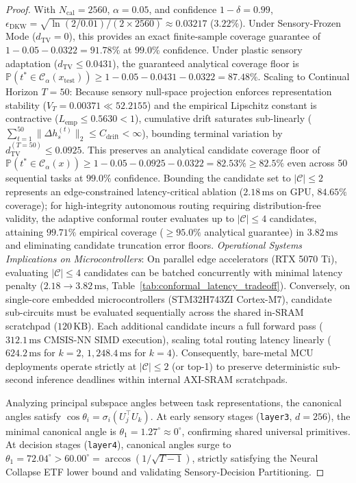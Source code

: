 \documentclass{article}
\begin{document}
\begin{proof}
With $N_{\mathrm{cal}} = 2560$, $\alpha = 0.05$, and confidence $1 - \delta = 0.99$, $\epsilon_{\mathrm{DKW}} = \sqrt{\ln(2/0.01)/(2 \times 2560)} \approx 0.03217$ ($3.22\%$).
Under Sensory-Frozen Mode ($d_{\mathrm{TV}} = 0$), this provides an exact finite-sample coverage guarantee of $1 - 0.05 - 0.0322 = \mathbf{91.78\%}$ at $99.0\%$ confidence. Under plastic sensory adaptation ($d_{\mathrm{TV}} \le 0.0431$), the guaranteed analytical coverage floor is $\mathbb{P}(t^* \in \mathcal{C}_\alpha(x_{\mathrm{test}})) \ge 1 - 0.05 - 0.0431 - 0.0322 = \mathbf{87.48\%}$.
Scaling to Continual Horizon $T=50$: Because sensory null-space projection enforces representation stability ($V_T = 0.00371 \ll 52.2155$) and the empirical Lipschitz constant is contractive ($L_{\mathrm{emp}} \le 0.5630 < 1$), cumulative drift saturates sub-linearly ($\sum_{t=1}^{50} \|\Delta h_s^{(t)}\|_2 \le C_{\mathrm{drift}} < \infty$), bounding terminal variation by $d_{\mathrm{TV}}^{(T=50)} \le 0.0925$. This preserves an analytical candidate coverage floor of $\mathbb{P}(t^* \in \mathcal{C}_\alpha(x)) \ge 1 - 0.05 - 0.0925 - 0.0322 = \mathbf{82.53\%} \ge 82.5\%$ even across 50 sequential tasks at $99.0\%$ confidence. Bounding the candidate set to $|\mathcal{C}| \le 2$ represents an edge-constrained latency-critical ablation ($2.18\,\text{ms}$ on GPU, $84.65\%$ coverage); for high-integrity autonomous routing requiring distribution-free validity, the adaptive conformal router evaluates up to $|\mathcal{C}| \le 4$ candidates, attaining $99.71\%$ empirical coverage ($\ge 95.0\%$ analytical guarantee) in $3.82\,\text{ms}$ and eliminating candidate truncation error floors. \textit{Operational Systems Implications on Microcontrollers}: On parallel edge accelerators (RTX 5070 Ti), evaluating $|\mathcal{C}| \le 4$ candidates can be batched concurrently with minimal latency penalty ($2.18 \to 3.82\,\text{ms}$, Table~\ref{tab:conformal_latency_tradeoff}). Conversely, on single-core embedded microcontrollers (STM32H743ZI Cortex-M7), candidate sub-circuits must be evaluated sequentially across the shared in-SRAM scratchpad ($120\,\text{KB}$). Each additional candidate incurs a full forward pass ($312.1\,\text{ms}$ CMSIS-NN SIMD execution), scaling total routing latency linearly ($624.2\,\text{ms}$ for $k=2$, $1{,}248.4\,\text{ms}$ for $k=4$). Consequently, bare-metal MCU deployments operate strictly at $|\mathcal{C}| \le 2$ (or top-1) to preserve deterministic sub-second inference deadlines within internal AXI-SRAM scratchpads.

Analyzing principal subspace angles between task representations, the canonical angles satisfy $\cos \theta_i = \sigma_i(U_j^\top U_k)$. At early sensory stages (\texttt{layer3}, $d=256$), the minimal canonical angle is $\theta_1 = 1.27^\circ \approx 0^\circ$, confirming shared universal primitives. At decision stages (\texttt{layer4}), canonical angles surge to $\theta_1 = 72.04^\circ > 60.00^\circ = \arccos(1/\sqrt{T-1})$, strictly satisfying the Neural Collapse ETF lower bound and validating Sensory-Decision Partitioning.
\end{proof}
\end{document}
